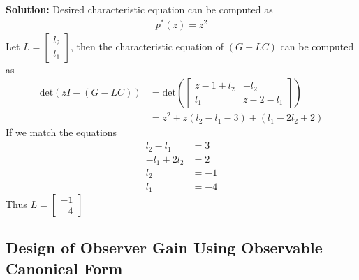 \documentclass[twoside]{article}
\begin{document}
\textbf{Solution:} Desired characteristic equation can be computed as
%
\begin{align*}
  p^*(z) = z^2
\end{align*}
%
Let $L = \left[ \begin{array}{c} l_2 \\ l_1 \end{array} \right]$, then
the characteristic equation of $(G - L C)$ can be computed as
%
\begin{align*}
  \mathrm{det} \left( z I - ( G - L C ) \right) &= 
  \mathrm{det} \left(
  \left[ \begin{array}{cc} z - 1 + l_2 & -l_2 \\ l_1 & z - 2 - l_1 \end{array} \right]
  \right)
\\
&= z^2 + z (l_2 - l_1 - 3) + (l_1 - 2 l_2 + 2)
\end{align*}
%
If we match the equations
%
\begin{align*}
  l_2 - l_1 &= 3
\\
  -l_1 + 2 l_2 &= 2
\\
 l_2 &= -1
\\
 l_1 &= -4
\end{align*}
%
Thus $L = \left[ \begin{array}{c} -1 \\ -4 \end{array} \right]$

\subsection*{Design of Observer Gain Using Observable Canonical
Form}
\end{document}
